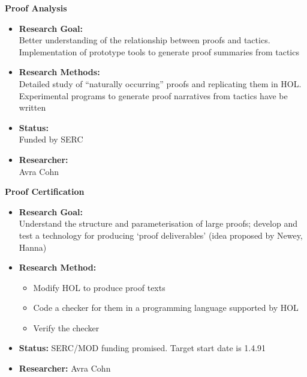 \begin{center}{\bf Proof Analysis}\end{center}
\begin{itemize}
\item {\bf Research Goal:} $\;$ \\
Better understanding of the relationship between proofs and tactics.
Implementation of prototype tools to generate proof summaries from
tactics
\item {\bf Research Methods:} $\;$ \\
Detailed study of ``naturally occurring'' proofs and replicating them in
{\small HOL}.  Experimental programs to generate proof narratives from
tactics have be written
\item {\bf Status:}$\;$ \\
Funded by SERC
\item {\bf Researcher:} $\;$ \\
Avra Cohn
\end{itemize}

\begin{center}{\bf Proof Certification}\end{center}
\begin{itemize}
\item {\bf Research Goal:} $\;$ \\
Understand the structure and parameterisation of large proofs;
develop and test a technology for producing 
`proof deliverables' (idea proposed by Newey, Hanna)
\item {\bf Research Method:} 
\begin{itemize}
\item Modify {\small HOL} to produce proof texts
\item  Code a checker for
them in a programming language supported by {\small HOL}
\item Verify the checker
\end{itemize}
\item {\bf Status:} {\small SERC}/{\small MOD} funding promised.
Target start date is 1.4.91
\item {\bf Researcher:} Avra Cohn
\end{itemize}


